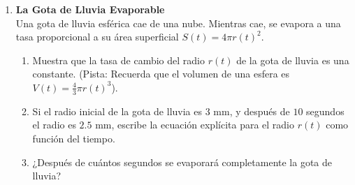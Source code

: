 \documentclass[a4paper,11pt]{article}
\begin{document}
\begin{enumerate}[itemsep=0.4cm, label=\textbf{\arabic*.}]
    \item \textbf{La Gota de Lluvia Evaporable} \\
    Una gota de lluvia esférica cae de una nube. Mientras cae, se evapora a una tasa proporcional a su área superficial $S(t) = 4\pi r(t)^2$.
    \begin{enumerate}[label=(\alph*), itemsep=0.1cm]
        \item Muestra que la tasa de cambio del radio $r(t)$ de la gota de lluvia es una constante. (Pista: Recuerda que el volumen de una esfera es $V(t) = \frac{4}{3}\pi r(t)^3$).
        \item Si el radio inicial de la gota de lluvia es $3\text{ mm}$, y después de $10$ segundos el radio es $2.5\text{ mm}$, escribe la ecuación explícita para el radio $r(t)$ como función del tiempo.
        \item ¿Después de cuántos segundos se evaporará completamente la gota de lluvia?
    \end{enumerate}

\end{enumerate}
\end{document}
